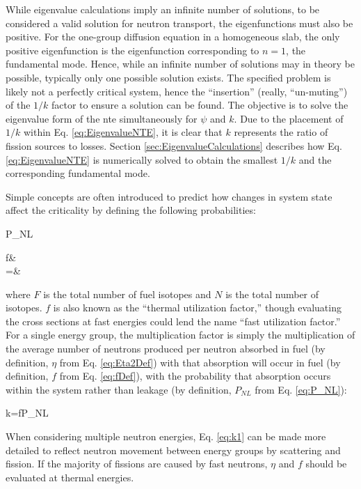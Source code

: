 While eigenvalue calculations imply an infinite number of solutions, to be considered a valid solution for neutron transport, the eigenfunctions must also be positive. For the one-group diffusion equation in a homogeneous slab, the only positive eigenfunction is the eigenfunction corresponding to \(n=1\), the fundamental mode. Hence, while an infinite number of solutions may in theory be possible, typically only one possible solution exists. The specified problem is likely not a perfectly critical system, hence the ``insertion'' (really, ``un-muting'') of the \(1/k\) factor to ensure a solution can be found. The objective is to solve the eigenvalue form of the \gls{nte} simultaneously for \(\psi\) and \(k\). Due to the placement of \(1/k\) within Eq. \eqref{eq:EigenvalueNTE}, it is clear that \(k\) represents the ratio of fission sources to losses. Section \ref{sec:EigenvalueCalculations} describes how Eq. \eqref{eq:EigenvalueNTE} is numerically solved to obtain the smallest \(1/k\) and the corresponding fundamental mode.

 
 Simple concepts are often introduced to predict how changes in system state affect the criticality by defining the following probabilities:
 
 \beq
 \label{eq:P_NL}
 P_{NL}\equiv{}
 \eeq
 
 \beqa
 \label{eq:fDef}
 f\equiv&\ \\
 =&\ 
 \eeqa
 
 where \(F\) is the total number of fuel isotopes and \(N\) is the total number of isotopes. \(f\) is also known as the ``thermal utilization factor,'' though evaluating the cross sections at fast energies could lend the name ``fast utilization factor.'' For a single energy group, the multiplication factor is simply the multiplication of the average number of neutrons produced per neutron absorbed in fuel (by definition, \(\eta\) from Eq. \eqref{eq:Eta2Def}) with that absorption will occur in fuel (by definition, \(f\) from Eq. \eqref{eq:fDef}), with the probability that absorption occurs within the system rather than leakage (by definition, \(P_{NL}\) from Eq. \eqref{eq:P_NL}):
 
 \beq
 \label{eq:k1}
 k=\eta fP_{NL}
 \eeq
 
When considering multiple neutron energies, Eq. \eqref{eq:k1} can be made more detailed to reflect neutron movement between energy groups by scattering and fission. If the majority of fissions are caused by fast neutrons, \(\eta\) and \(f\) should be evaluated at thermal energies. 